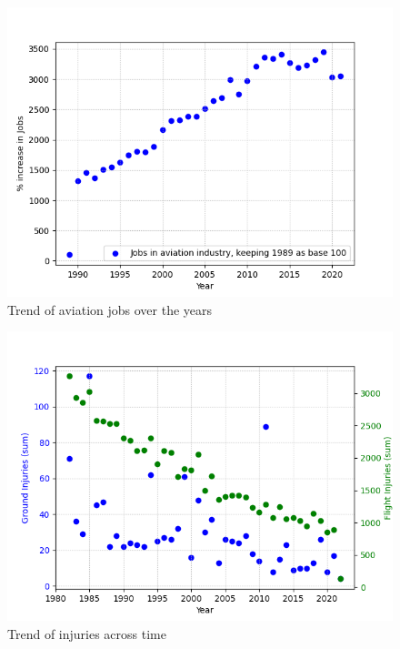 \documentclass[
  man,floatsintext]{apa7}
\begin{document}
\begin{figure}

{\centering \includegraphics{./graphs/Jobs in the aviation industry} 

}

\caption{Trend of aviation jobs over the years}\label{fig:aviation-jobs-image}
\end{figure}

\begin{figure}

{\centering \includegraphics{./graphs/flight_injuries} 

}

\caption{Trend of injuries across time}\label{fig:aviation-incident-plot}
\end{figure}
\end{document}
